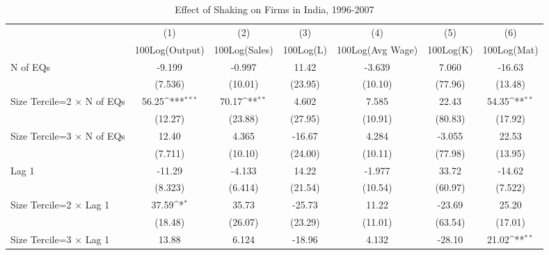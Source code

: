 \begin{table}[htbp]\centering
\def\sym#1{\ifmmode^{#1}\else\(^{#1}\)\fi}
\caption{Effect of Shaking on Firms in India, 1996-2007}
\begin{tabular}{l*{6}{c}}
\toprule
                &\multicolumn{1}{c}{(1)}&\multicolumn{1}{c}{(2)}&\multicolumn{1}{c}{(3)}&\multicolumn{1}{c}{(4)}&\multicolumn{1}{c}{(5)}&\multicolumn{1}{c}{(6)}\\
                &\multicolumn{1}{c}{100Log(Output)}&\multicolumn{1}{c}{100Log(Sales)}&\multicolumn{1}{c}{100Log(L)}&\multicolumn{1}{c}{100Log(Avg Wage)}&\multicolumn{1}{c}{100Log(K)}&\multicolumn{1}{c}{100Log(Mat)}\\
\midrule
N of EQs        &   -9.199         &   -0.997         &    11.42         &   -3.639         &    7.060         &   -16.63         \\
                &  (7.536)         &  (10.01)         &  (23.95)         &  (10.10)         &  (77.96)         &  (13.48)         \\
\addlinespace
Size Tercile=2 $\times$ N of EQs&    56.25\sym{***}&    70.17\sym{**} &    4.602         &    7.585         &    22.43         &    54.35\sym{**} \\
                &  (12.27)         &  (23.88)         &  (27.95)         &  (10.91)         &  (80.83)         &  (17.92)         \\
\addlinespace
Size Tercile=3 $\times$ N of EQs&    12.40         &    4.365         &   -16.67         &    4.284         &   -3.055         &    22.53         \\
                &  (7.711)         &  (10.10)         &  (24.00)         &  (10.11)         &  (77.98)         &  (13.95)         \\
\addlinespace
Lag 1           &   -11.29         &   -4.133         &    14.22         &   -1.977         &    33.72         &   -14.62         \\
                &  (8.323)         &  (6.414)         &  (21.54)         &  (10.54)         &  (60.97)         &  (7.522)         \\
\addlinespace
Size Tercile=2 $\times$ Lag 1&    37.59\sym{*}  &    35.73         &   -25.73         &    11.22         &   -23.69         &    25.20         \\
                &  (18.48)         &  (26.07)         &  (23.29)         &  (11.01)         &  (63.54)         &  (17.01)         \\
\addlinespace
Size Tercile=3 $\times$ Lag 1&    13.88         &    6.124         &   -18.96         &    4.132         &   -28.10         &    21.02\sym{**} \\

\end{tabular}
\end{table}

